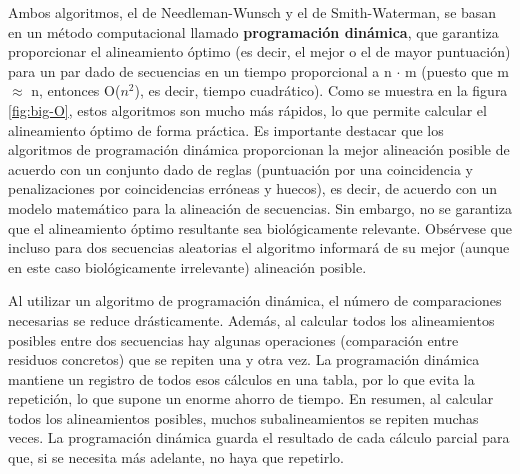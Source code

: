 Ambos algoritmos, el de Needleman-Wunsch y el de Smith-Waterman, se basan en un método computacional llamado \textbf{programación dinámica}, que garantiza proporcionar el alineamiento óptimo (es decir, el mejor o el de mayor puntuación) para un par dado de secuencias en un tiempo proporcional a n $\cdot$ m (puesto que m $\approx$ n, entonces O($n^2$), es decir, tiempo cuadrático). Como se muestra en la figura \ref{fig:big-O}, estos algoritmos son mucho más rápidos, lo que permite calcular el alineamiento óptimo de forma práctica. Es importante destacar que los algoritmos de programación dinámica proporcionan la mejor alineación posible de acuerdo con un conjunto dado de reglas (puntuación por una coincidencia y penalizaciones por coincidencias erróneas y huecos), es decir, de acuerdo con un modelo matemático para la alineación de secuencias. Sin embargo, no se garantiza que el alineamiento óptimo resultante sea biológicamente relevante. Obsérvese que incluso para dos secuencias aleatorias el algoritmo informará de su mejor (aunque en este caso biológicamente irrelevante) alineación posible.

Al utilizar un algoritmo de programación dinámica, el número de comparaciones necesarias se reduce drásticamente. Además, al calcular todos los alineamientos posibles entre dos secuencias hay algunas operaciones (comparación entre residuos concretos) que se repiten una y otra vez. La programación dinámica mantiene un registro de todos esos cálculos en una tabla, por lo que evita la repetición, lo que supone un enorme ahorro de tiempo. En resumen, al calcular todos los alineamientos posibles, muchos subalineamientos se repiten muchas veces. La programación dinámica guarda el resultado de cada cálculo parcial para que, si se necesita más adelante, no haya que repetirlo. 

